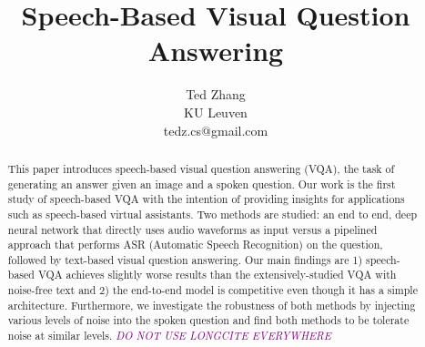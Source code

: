 \documentclass[letterpaper]{article} %
\newcommand{\tz}[1]{\textcolor{purple}{\textit{#1}}}
\begin{document}
\title{Speech-Based Visual Question Answering}

\author{Ted Zhang\\
KU Leuven\\
tedz.cs@gmail.com}




\maketitle
\begin{abstract}
This paper introduces speech-based visual question answering (VQA), the task of generating an answer given an image and a spoken question. Our work is the first study of speech-based VQA with the intention of providing insights for applications such as speech-based virtual assistants. Two methods are studied: an end to end, deep neural network that directly uses audio waveforms as input versus a pipelined approach that performs ASR (Automatic Speech Recognition) on the question, followed by text-based visual question answering. Our main findings are 1) speech-based VQA achieves slightly worse results than the extensively-studied VQA with noise-free text and 2) the end-to-end model is competitive even though it has a simple architecture. Furthermore, we investigate the robustness of both methods by injecting various levels of noise into the spoken question and find both methods to be tolerate noise at similar levels.
\tz{DO NOT USE LONGCITE EVERYWHERE}
\end{abstract}
\end{document}
